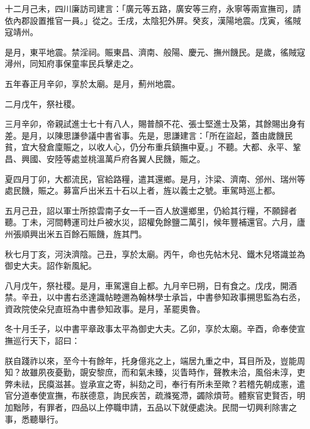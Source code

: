 \begin{pinyinscope}
 十二月己未，四川廉訪司建言：「廣元等五路，廣安等三府，永寧等兩宣撫司，請依內郡設置推官一員。」從之。壬戌，太陰犯外屏。癸亥，漢陽地震。戊寅，徭賊寇靖州。



 是月，東平地震。禁淫祠。賑東昌、濟南、般陽、慶元、撫州饑民。是歲，徭賊寇潯州，同知府事保童率民兵擊走之。



 五年春正月辛卯，享於太廟。是月，薊州地震。



 二月戊午，祭社稷。



 三月辛卯，帝親試進士七十有八人，賜普顏不花、張士堅進士及第，其餘賜出身有差。是月，以陳思謙參議中書省事。先是，思謙建言：「所在盜起，蓋由歲饑民貧，宜大發倉廩賑之，以收人心，仍分布重兵鎮撫中夏。」不聽。大都、永平、鞏昌、興國、安陸等處並桃溫萬戶府各翼人民饑，賑之。



 夏四月丁卯，大都流民，官給路糧，遣其還鄉。是月，汴梁、濟南、邠州、瑞州等處民饑，賑之。募富戶出米五十石以上者，旌以義士之號。車駕時巡上都。



 五月己丑，詔以軍士所掠雲南子女一千一百人放還鄉里，仍給其行糧，不願歸者聽。丁未，河間轉運司灶戶被水災，詔權免餘鹽二萬引，候年豐補還官。六月，廬州張順興出米五百餘石賑饑，旌其門。



 秋七月丁亥，河決濟陰。己丑，享於太廟。丙午，命也先帖木兒、鐵木兒塔識並為御史大夫。詔作新風紀。



 八月戊午，祭社稷。是月，車駕還自上都。九月辛巳朔，日有食之。戊戌，開酒禁。辛丑，以中書右丞達識帖睦邇為翰林學士承旨，中書參知政事搠思監為右丞，資政院使朵兒直班為中書參知政事。是月，革罷奧魯。



 冬十月壬子，以中書平章政事太平為御史大夫。乙卯，享於太廟。辛酉，命奉使宣撫巡行天下，詔曰：



 朕自踐祚以來，至今十有餘年，托身億兆之上，端居九重之中，耳目所及，豈能周知？故雖夙夜憂勤，覬安黎庶，而和氣未臻，災眚時作，聲教未洽，風俗未淳，吏弊未祛，民瘼滋甚。豈承宣之寄，糾劾之司，奉行有所未至歟？若稽先朝成憲，遣官分道奉使宣撫，布朕德意，詢民疾苦，疏滌冤滯，蠲除煩苛。體察官吏賢否，明加黜陟，有罪者，四品以上停職申請，五品以下就便處決。民間一切興利除害之事，悉聽舉行。




\end{pinyinscope}
